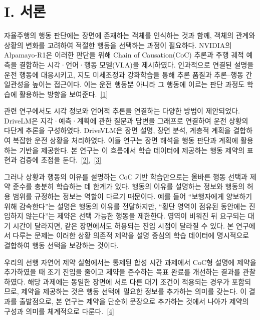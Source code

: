 \documentclass[11pt,a4paper]{article}
\begin{document}
\section*{I. 서론}
자율주행의 행동 판단에는 장면에 존재하는 객체를 인식하는 것과 함께, 객체의 관계와 상황의 변화를 고려하여 적절한 행동을 선택하는 과정이 필요하다. NVIDIA의 Alpamayo-R1은 이러한 판단을 위해 Chain of Causation(CoC) 추론과 주행 궤적 예측을 결합하는 시각·언어·행동 모델(VLA)을 제시하였다. 인과적으로 연결된 설명을 운전 행동에 대응시키고, 지도 미세조정과 강화학습을 통해 추론 품질과 추론–행동 간 일관성을 높이는 접근이다. 이는 운전 행동뿐 아니라 그 행동에 이르는 판단 과정도 학습에 활용하는 방향을 보여준다.~\href{\detokenize{https://arxiv.org/abs/2511.00088}}{[1]}\par\vspace{5pt}
관련 연구에서도 시각 정보와 언어적 추론을 연결하는 다양한 방법이 제안되었다. DriveLM은 지각·예측·계획에 관한 질문과 답변을 그래프로 연결하여 운전 상황의 다단계 추론을 구성하였다. DriveVLM은 장면 설명, 장면 분석, 계층적 계획을 결합하여 복잡한 운전 상황을 처리하였다. 이들 연구는 장면 해석을 행동 판단과 계획에 활용하는 기반을 제공한다. 본 연구는 이 흐름에서 학습 데이터에 제공하는 행동 제약의 표현과 검증에 초점을 둔다.~\href{\detokenize{https://arxiv.org/abs/2312.14150}}{[2]},~\href{\detokenize{https://arxiv.org/abs/2402.12289}}{[3]}\par\vspace{5pt}
그러나 상황과 행동의 이유를 설명하는 CoC 기반 학습만으로는 올바른 행동 선택과 제약 준수를 충분히 학습하는 데 한계가 있다. 행동의 이유를 설명하는 정보와 행동의 허용 범위를 규정하는 정보는 역할이 다르기 때문이다. 예를 들어 “보행자에게 양보하기 위해 감속한다”는 설명은 행동의 이유를 전달하지만, “횡단 영역이 점유된 동안에는 진입하지 않는다”는 제약은 선택 가능한 행동을 제한한다. 영역이 비워진 뒤 요구되는 대기 시간이 달라지면, 같은 장면에서도 허용되는 진입 시점이 달라질 수 있다. 본 연구에서 다루는 문제는 이러한 상황 의존적 제약을 설명 중심의 학습 데이터에 명시적으로 결합하여 행동 선택을 보강하는 것이다.\par\vspace{5pt}
우리의 선행 자연어 제약 실험에서는 통제된 합성 시간 과제에서 CoC형 설명에 제약을 추가하였을 때 조기 진입을 줄이고 제약을 준수하는 목표 완료를 개선하는 결과를 관찰하였다. 해당 과제에는 동일한 장면에 서로 다른 대기 조건이 적용되는 경우가 포함되므로, 제약을 제공하는 것은 행동 선택에 필요한 정보를 추가하는 의미를 갖는다. 이 결과를 출발점으로, 본 연구는 제약을 단순히 문장으로 추가하는 것에서 나아가 제약의 구성과 의미를 체계적으로 다룬다.~\href{\detokenize{../../../../../../projects/01-safety-constrained-coc/docs/reports/TEMPORAL_GUARD_MULTISEED_EXPERIMENT_REPORT_V01.md}}{[4]}\par\vspace{5pt}
\end{document}
